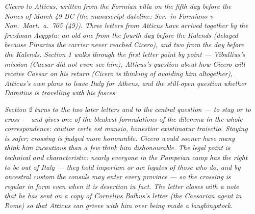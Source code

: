 
\textit{Cicero to Atticus, written from the Formian
villa on the fifth day before the Nones of March 49 BC
(the manuscript dateline: \textit{Scr.\ in Formiano v
Non.\ Mart.\ a.\ 705 (49)}). Three letters from Atticus
have arrived together by the freedman Aegypta: an old
one from the fourth day before the Kalends (delayed
because Pinarius the carrier never reached Cicero), and
two from the day before the Kalends. Section 1 walks
through the first letter point by point ---
Vibullius's mission (Caesar did not even see him),
Atticus's question about how Cicero will receive Caesar
on his return (Cicero is thinking of avoiding him
altogether), Atticus's own plans to leave Italy for
Athens, and the still-open question whether Domitius is
travelling with his fasces.}

\textit{Section 2 turns to the two later letters and to
the central question --- to stay or to cross --- and
gives one of the bleakest formulations of the dilemma
in the whole correspondence: \textit{cautior certe est
mansio, honestior existimatur traiectio}. Staying is
safer; crossing is judged more honourable. Cicero would
sooner have many think him incautious than a few think
him dishonourable. The legal point is technical and
characteristic: nearly everyone in the Pompeian camp
has the right to be out of Italy --- they hold
\textit{imperium} or are legates of those who do, and
by ancestral custom the consuls may enter every
province --- so the crossing is regular in form even
when it is desertion in fact. The letter closes with a
note that he has sent on a copy of Cornelius Balbus's
letter (the Caesarian agent in Rome) so that Atticus
can grieve with him over being made a laughingstock.}
